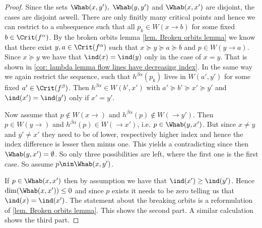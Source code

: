\begin{proof}
	Since the sets $\Whab(x,y'),~\Whab(y,y')$ and $\Whab(x,x')$ are disjoint, the cases are disjoint aswell. There are only finitly many critical points and hence we can restrict to a subsequence such that all $p_k\in W(x\to b)$ for some fixed $b\in \Crit(f^{\alpha})$. By the broken orbits lemma \ref{lem. Broken orbits lemma} we know that there exist $y,a\in \Crit(f^{\alpha})$ such that $x\succeq y\succeq a\succeq b$ and $p\in W(y\to a)$. Since $x\succeq y$ we have that $\ind(x)=\ind(y)$ only in the case of $x=y$. That is shown in \ref{cor: lambda lemma flow lines have decreasing index}. In the same way we again restrict the sequence, such that $h^{\beta\alpha}(p_k)$ lives in $W(a',y')$ for some fixed $a'\in \Crit(f^{\beta})$. Then $h^{\beta\alpha}\in W(b',x')$ with $a'\succeq b'\succeq x'\succeq y'$ and $\ind(x')=\ind(y')$ only if $x'=y'$.
	
	Now assume that $p\nin W(x\to)$ and $h^{\beta\alpha}(p)\notin W(\to y')$. Then $p\in W(y\to)$ and $h^{\beta \alpha}(p)\in W(\to x')$, i.e. $p\in \Whab(y,x')$. But since $x\neq y$ and $y'\neq x'$ they need to be of lower, respectively higher index and hence the index difference is lesser then minus one. This yields a contradicting since then $\Whab(y,x')=\emptyset$. So only three possibilities are left, where the first one is the first case. So assume $p\nin \Whab(x,y')$. 
	
	If $p\in \Whab(x,x')$ then by assumption we have that $\ind(x')\geq \ind(y')$. Hence $\dim(\Whab(x,x'))\leq 0$ and since $p$ exists it needs to be zero telling us that $\ind(x)=\ind(x')$. The statement about the breaking orbits is a reformulation of \ref{lem. Broken orbits lemma}. This shows the second part. 
	A similar calculation shows the third part.
\end{proof}

